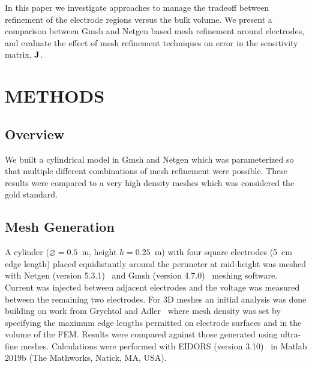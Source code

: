 In this paper we investigate approaches to manage the tradeoff
between refinement of the electrode regions versus the bulk volume. 
We present a comparison between Gmsh and 
Netgen based mesh refinement around electrodes, and evaluate the 
effect of mesh refinement techniques on error in  the sensitivity matrix, 
$\bf J$. 

\section{METHODS}
\subsection{Overview}

We built a cylindrical model in Gmsh and Netgen which was parameterized so that multiple
different combinations of mesh refinement were possible.
These results were compared to a very high density meshes which was considered the gold standard.

\subsection{Mesh Generation}
A cylinder ($\diameter=0.5$~m, height $h=0.25$~m) with four square electrodes 
(5~cm edge length) placed equidistantly around the perimeter at mid-height was
meshed with Netgen (version 5.3.1)~\parencite{schoberl_netgen_1997} and Gmsh 
(version 4.7.0)~\parencite{geuzaine_gmsh_2009}
meshing software.
Current was injected between adjacent electrodes and the voltage was measured between the remaining
two electrodes.
For 3D meshes an initial analysis was done building on work from 
Grychtol and Adler~\parencite{grychtol_fem_2013} where mesh density was
set by specifying the maximum edge lengths permitted on electrode surfaces
and in the volume of the FEM.
Results were compared against those generated using ultra-fine meshes. 
Calculations were performed with EIDORS (version 3.10)~\parencite{adler_uses_2006} 
in Matlab 2019b
(The Mathworks, Natick, MA, USA).


